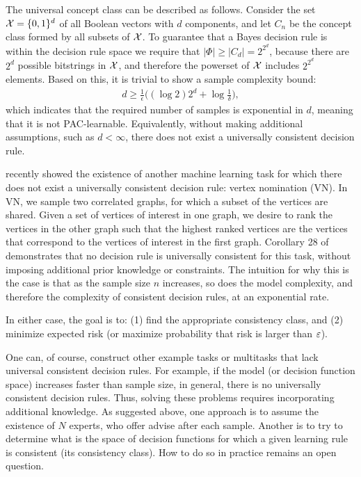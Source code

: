 \documentclass{article}
\begin{document}
The universal concept class can be described as follows.  Consider the set $\mathcal{X}=\{0,1\}^d$ of all Boolean vectors with $d$ components, and let $C_n$ be the concept class formed by all subsets of $\mathcal{X}$.  To guarantee that a Bayes decision rule is within the decision rule space we require that $|\Phi| \geq |C_d| = 2^{2^d}$, because there are $2^d$ possible bitstrings in $\mathcal{X}$, and therefore the powerset of $\mathcal{X}$ includes $2^{2^d}$ elements.  Based on this, it is trivial to show a sample complexity bound:
\begin{align}
    d \geq \frac{1}{\epsilon} \big(  (\log 2) 2^d + \log \frac{1}{\delta} \big),
\end{align}
which indicates that the required number of samples is exponential in $d$, meaning that it is not PAC-learnable.  Equivalently, without making additional assumptions, such as $d < \infty$, there does not exist a universally consistent decision rule. 

\citet{Lyzinski2017} recently showed the existence of another machine learning task for which there does not exist a universally consistent decision rule: vertex nomination (VN).  In VN, we sample two correlated graphs, for which a subset of the vertices are shared.  Given a set of vertices of interest in one graph, we desire to rank the vertices in the other graph such that the highest ranked vertices are the vertices that correspond to the vertices of interest in the first graph.  Corollary 28 of~\citet{Lyzinski2017} demonstrates that no decision rule is universally consistent for this task, without imposing additional prior knowledge or constraints.   The intuition for why this is the case is that as the sample size $n$ increases, so does the model complexity, and therefore the complexity of consistent decision rules, at an exponential rate.

In either case, the goal is to: (1) find the appropriate consistency class, and (2) minimize expected risk (or maximize probability that risk is larger than $\varepsilon$). 

One can, of course, construct other example tasks or multitasks that lack universal consistent decision rules.  For example, if the model (or decision function space) increases faster than sample size, in general, there is no universally consistent decision rules.  Thus, solving these problems requires incorporating additional knowledge.  As suggested above, one approach is to assume the existence of $N$ experts, who offer advise after each sample.  Another is to try to determine what is the space of decision functions for which a given learning rule is consistent (its consistency class).  How to do so in practice remains an open question.
\end{document}
